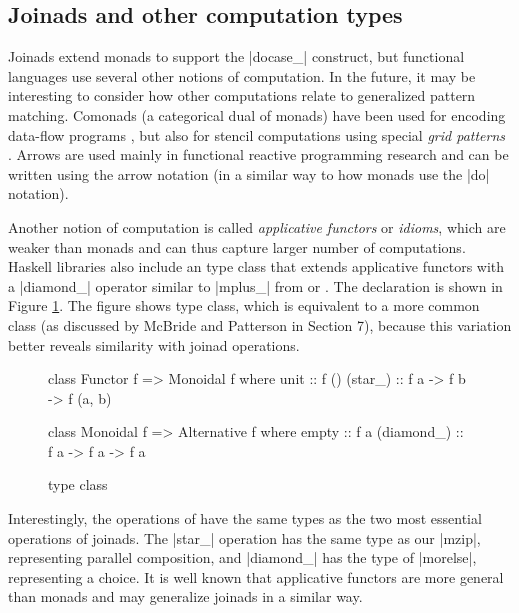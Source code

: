 \documentclass{sigplanconf}
\begin{document}
\subsection{Joinads and other computation types}
Joinads extend monads to support the |docase_| construct, but functional languages use several other
notions of computation. In the future, it may be interesting to consider how other computations
relate to generalized pattern matching. Comonads (a categorical dual of monads) \cite{comonads-codata} 
have been used for encoding data-flow programs \cite{comonads-dataflow}, but also for stencil 
computations using special \textit{grid patterns} \cite{comomads-ypnos}. Arrows 
\cite{generalisingmonads, causalarr} are used mainly in functional reactive programming research 
\cite{arrows-frp} and can be written using the arrow notation \cite{arrows-notation} (in a similar 
way to how monads use the |do| notation).

Another notion of computation is called \textit{applicative functors} \cite{applicative} or 
\textit{idioms}, which are weaker than monads and can thus capture larger number of computations. 
Haskell libraries also include an  type class that extends applicative functors 
with a |diamond_| operator similar to |mplus_| from  or . The 
declaration is shown in Figure \ref{fig:alternative-typeclass}. The figure shows  type
class, which is equivalent to a more common  class (as discussed by McBride and 
Patterson \cite{applicative} in Section 7), because this variation better reveals similarity with
joinad operations.

\begin{figure}
\begin{code}
class Functor f => Monoidal f where
  unit :: f ()
  (star_) :: f a -> f b -> f (a, b)

class Monoidal f => Alternative f where
  empty :: f a
  (diamond_) :: f a -> f a -> f a
\end{code}
\caption{ type class}
\label{fig:alternative-typeclass}
\end{figure}

Interestingly, the operations of  have the same types as the two most essential 
operations of joinads. The |star_| operation has the same type as our |mzip|, representing parallel 
composition, and |diamond_| has the type of |morelse|, representing a choice. It is well known that
applicative functors are more general than monads and  may generalize joinads
in a similar way.
\end{document}
